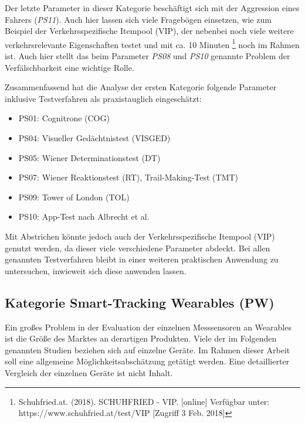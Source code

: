 Der letzte Parameter in dieser Kategorie beschäftigt sich mit der Aggression eines Fahrers (\textit{PS11}). Auch hier lassen sich viele Fragebögen einsetzen, wie zum Beispiel der Verkehrsspezifische Itempool (VIP), der nebenbei noch viele weitere verkehrsrelevante Eigenschaften testet und mit ca. 10 Minuten \footnote{Schuhfried.at. (2018). SCHUHFRIED - VIP. [online] Verfügbar unter: https://www.schuhfried.at/test/VIP [Zugriff 3 Feb. 2018]} noch im Rahmen ist. Auch hier stellt das beim Parameter \textit{PS08} und \textit{PS10} genannte Problem der Verfälschbarkeit eine wichtige Rolle.

Zusammenfassend hat die Analyse der ersten Kategorie folgende Parameter inklusive Testverfahren als praxistauglich eingeschätzt:

\begin{flushleft}
	\begin{itemize}
		\setlength\itemsep{2pt}
		\item PS01: Cognitrone (COG) 
		\item PS04: Visueller Gedächtnistest (VISGED) 
		\item PS05: Wiener Determinationstest (DT) 
		\item PS07: Wiener Reaktionstest (RT), Trail-Making-Test (TMT)
		\item PS09: Tower of London (TOL) 
		\item PS10: App-Test nach Albrecht et al. \cite{mobilesmarttracking} 
	\end{itemize}
\end{flushleft}
Mit Abstrichen könnte jedoch auch der Verkehrsspezifische Itempool (VIP) genutzt werden, da dieser viele verschiedene Parameter abdeckt. Bei allen genannten Testverfahren bleibt in einer weiteren praktischen Anwendung zu untersuchen, inwieweit sich diese anwenden lassen.

\subsection{Kategorie Smart-Tracking Wearables (PW)}

Ein großes Problem in der Evaluation der einzelnen Messsensoren an Wearables ist die Größe des Marktes an derartigen Produkten. Viele der im Folgenden genannten Studien beziehen sich auf einzelne Geräte. Im Rahmen dieser Arbeit soll eine allgemeine Möglichkeitsabschätzung getätigt werden. Eine detaillierter Vergleich der einzelnen Geräte ist nicht Inhalt.


